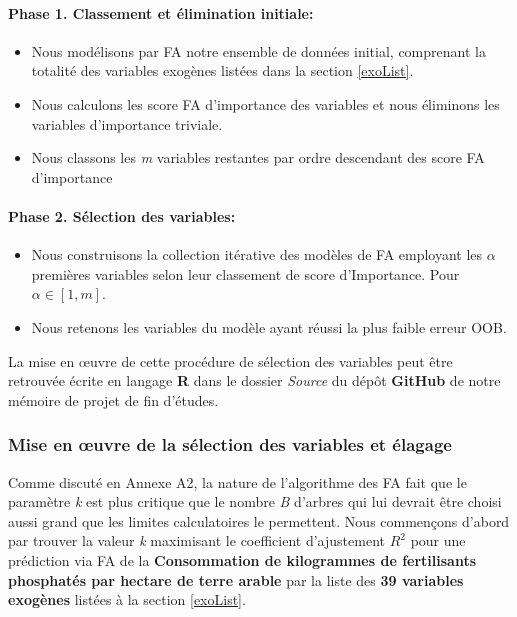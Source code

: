 	\paragraph{Phase 1. Classement et élimination initiale:}\begin{itemize}
	\item Nous modélisons par FA notre ensemble de données initial, comprenant la totalité des variables exogènes listées dans la section \ref{exoList}.
	\item Nous calculons les score FA d'importance des variables et nous éliminons les variables d'importance triviale.
	\item Nous classons les \textit{m} variables restantes par ordre descendant des score FA d'importance
	\end{itemize}
	\paragraph{Phase 2. Sélection des variables:}
	\begin{itemize}
	\item Nous construisons la collection itérative des modèles de FA employant les \textit{$\alpha$} premières variables selon leur classement de score d'Importance. Pour ${\alpha \in [1,\textit{m}]}$.
	\item Nous retenons les variables du modèle ayant réussi la plus faible erreur OOB.
	\end{itemize}
	La mise en œuvre de cette procédure de sélection des variables peut être retrouvée écrite en langage \textbf{R} dans le dossier \textit{Source} du dépôt \textbf{GitHub} de notre mémoire de projet de fin d’études\cite{this}.
	\subsubsection{Mise en œuvre de la sélection des variables et élagage}
	Comme discuté en Annexe A2, la nature de l'algorithme des FA fait que le paramètre \textit{k} est plus critique que le nombre \textit{B} d'arbres qui lui devrait être choisi aussi grand que les limites calculatoires le permettent.
	Nous commençons d'abord par trouver la valeur \textit{k} maximisant le coefficient d'ajustement $R^2$ pour une prédiction via FA de la \textbf{Consommation de kilogrammes de fertilisants phosphatés par hectare de terre arable} par la liste des \textbf{39 variables exogènes} listées à la section \ref{exoList}.
